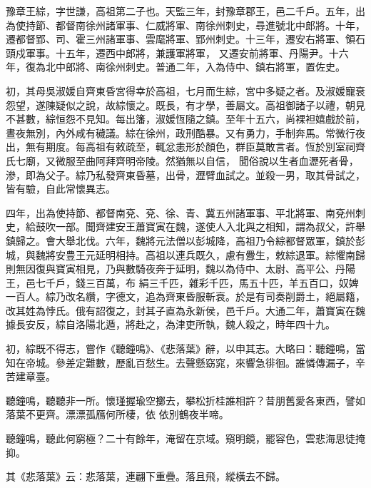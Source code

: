 
\begin{pinyinscope}

 豫章王綜，字世謙，高祖第二子也。天監三年，封豫章郡王，邑二千戶。五年，出為使持節、都督南徐州諸軍事、仁威將軍、南徐州刺史，尋進號北中郎將。十年，遷都督郢、司、霍三州諸軍事、雲麾將軍、郢州刺史。十三年，遷安右將軍、領石頭戍軍事。十五年，遷西中郎將，兼護軍將軍，
 又遷安前將軍、丹陽尹。十六年，復為北中郎將、南徐州刺史。普通二年，入為侍中、鎮右將軍，置佐史。



 初，其母吳淑媛自齊東昏宮得幸於高祖，七月而生綜，宮中多疑之者。及淑媛寵衰怨望，遂陳疑似之說，故綜懷之。既長，有才學，善屬文。高祖御諸子以禮，朝見不甚數，綜恒怨不見知。每出籓，淑媛恆隨之鎮。至年十五六，尚裸袒嬉戲於前，晝夜無別，內外咸有穢議。綜在徐州，政刑酷暴。又有勇力，手制奔馬。常微行夜出，無有期度。每高祖有敕疏至，輒忿恚形於顏色，群臣莫敢言者。恆於別室祠齊氏七廟，又微服至曲阿拜齊明帝陵。然猶無以自信，
 聞俗說以生者血瀝死者骨，滲，即為父子。綜乃私發齊東昏墓，出骨，瀝臂血試之。並殺一男，取其骨試之，皆有驗，自此常懷異志。



 四年，出為使持節、都督南兗、兗、徐、青、冀五州諸軍事、平北將軍、南兗州刺史，給鼓吹一部。聞齊建安王蕭寶寅在魏，遂使人入北與之相知，謂為叔父，許舉鎮歸之。會大舉北伐。六年，魏將元法僧以彭城降，高祖乃令綜都督眾軍，鎮於彭城，與魏將安豊王元延明相持。高祖以連兵既久，慮有釁生，敕綜退軍。綜懼南歸則無因復與寶寅相見，乃與數騎夜奔于延明，魏以為侍中、太尉、高平公、丹陽王，邑七千戶，錢三百萬，布
 絹三千匹，雜彩千匹，馬五十匹，羊五百口，奴婢一百人。綜乃改名纘，字德文，追為齊東昏服斬衰。於是有司奏削爵土，絕屬籍，改其姓為悖氏。俄有詔復之，封其子直為永新侯，邑千戶。大通二年，蕭寶寅在魏據長安反，綜自洛陽北遁，將赴之，為津吏所執，魏人殺之，時年四十九。



 初，綜既不得志，嘗作《聽鐘鳴》、《悲落葉》辭，以申其志。大略曰：聽鐘鳴，當知在帝城。參差定難數，歷亂百愁生。去聲懸窈窕，來響急徘徊。誰憐傳漏子，辛苦建章臺。



 聽鐘鳴，聽聽非一所。懷瑾握瑜空擲去，攀松折桂誰相許？昔朋舊愛各東西，譬如落葉不更齊。漂漂孤鴈何所棲，依
 依別鶴夜半啼。



 聽鐘鳴，聽此何窮極？二十有餘年，淹留在京域。窺明鏡，罷容色，雲悲海思徒掩抑。



 其《悲落葉》云：悲落葉，連翩下重疊。落且飛，縱橫去不歸。




\end{pinyinscope}
